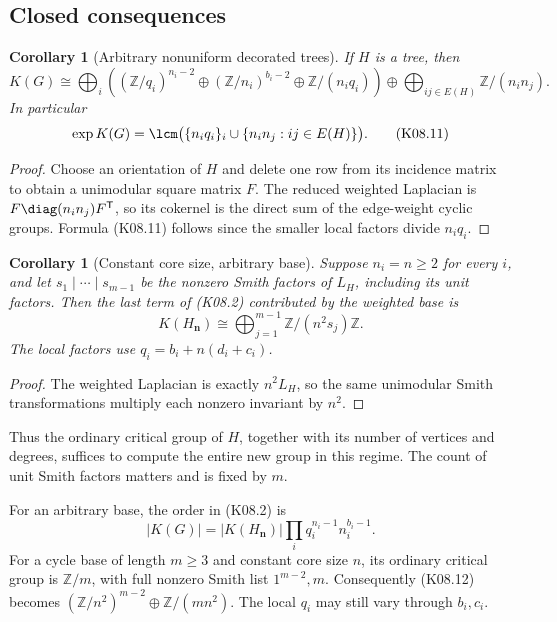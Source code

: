 \documentclass[11pt,a4paper]{article}
\newtheorem{corollary}[theorem]{Corollary}
\theoremstyle{definition}\newtheorem{definition}[theorem]{Definition}
\theoremstyle{remark}\newtheorem{remark}[theorem]{Remark}
\newcommand{\Z}{\mathbb Z}\newcommand{\Q}{\mathbb Q}\newcommand{\F}{\mathbb F}
\numberwithin{equation}{section}
\begin{document}
\subsection{Closed consequences}\label{K08-sec-4}
\begin{corollary}[Arbitrary nonuniform decorated trees]\label{K08-tree}
If $H$ is a tree, then
\[
 K(G)\cong
 \bigoplus_i\left((\Z/q_i)^{n_i-2}
 \oplus(\Z/n_i)^{b_i-2}\oplus\Z/(n_iq_i)\right)
 \oplus\bigoplus_{ij\in E(H)}\Z/(n_in_j).                    \tag{K08.10}
\]
In particular
\[
 \exp K(G)=\lcm\bigl(\{n_iq_i\}_i\cup\{n_in_j:ij\in E(H)\}\bigr).
                                                                    \tag{K08.11}
\]
\end{corollary}
\begin{proof}
Choose an orientation of $H$ and delete one row from its incidence matrix to obtain a unimodular square matrix $F$. The reduced weighted Laplacian is $F\diag(n_in_j)F^{\mathsf T}$, so its cokernel is the direct sum of the edge-weight cyclic groups. Formula (K08.11) follows since the smaller local factors divide $n_iq_i$.
\end{proof}

\begin{corollary}[Constant core size, arbitrary base]\label{K08-constant}
Suppose $n_i=n\geq2$ for every $i$, and let $s_1\mid\cdots\mid s_{m-1}$ be the nonzero Smith factors of $L_H$, including its unit factors. Then the last term of (K08.2) contributed by the weighted base is
\[
 K(H_{\mathbf n})\cong\bigoplus_{j=1}^{m-1}\Z/(n^2s_j)\Z.   \tag{K08.12}
\]
The local factors use $q_i=b_i+n(d_i+c_i)$.
\end{corollary}
\begin{proof}
The weighted Laplacian is exactly $n^2L_H$, so the same unimodular Smith transformations multiply each nonzero invariant by $n^2$.
\end{proof}
Thus the ordinary critical group of $H$, together with its number of vertices and degrees, suffices to compute the entire new group in this regime. The count of unit Smith factors matters and is fixed by $m$.

For an arbitrary base, the order in (K08.2) is
\[
 |K(G)|=|K(H_{\mathbf n})|\prod_iq_i^{n_i-1}n_i^{b_i-1}.     \tag{K08.13}
\]
For a cycle base of length $m\geq3$ and constant core size $n$, its ordinary critical group is $\Z/m$, with full nonzero Smith list $1^{m-2},m$. Consequently (K08.12) becomes $(\Z/n^2)^{m-2}\oplus\Z/(mn^2)$. The local $q_i$ may still vary through $b_i,c_i$.
\end{document}
